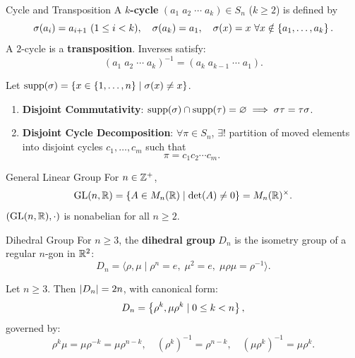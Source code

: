 \documentclass[12pt,a4paper]{article}
\begin{document}
    \begin{defi}{Cycle and Transposition}
        A \textbf{$k$-cycle} $(a_1 \; a_2 \; \cdots \; a_k) \in S_n$ ($k \ge 2$) is defined by
        \[
            \sigma(a_i) = a_{i+1} \ (1 \le i < k), \quad \sigma(a_k) = a_1, \quad \sigma(x) = x \ \forall x \notin \left\{ a_1, \ldots, a_k \right\}.
        \]
        A $2$-cycle is a \textbf{transposition}. Inverses satisfy:
        \[
            (a_1 \; a_2 \; \cdots \; a_k)^{-1} = (a_k \; a_{k-1} \; \cdots \; a_1).
        \]
    \end{defi}
    \bigskip
    
    \begin{prop}
        Let $\operatorname{supp}(\sigma) = \left\{ x \in \left\{ 1,\ldots,n \right\} \mid \sigma(x) \neq x \right\}$.
        \begin{enumerate}
            \item \textbf{Disjoint Commutativity}: $\operatorname{supp}(\sigma) \cap \operatorname{supp}(\tau) = \varnothing \implies \sigma\tau = \tau\sigma$.
            \item \textbf{Disjoint Cycle Decomposition}: $\forall \pi \in S_n$, $\exists!$ partition of moved elements into disjoint cycles $c_1, \ldots, c_m$ such that
            \[
                \pi = c_1 c_2 \cdots c_m.
            \]
        \end{enumerate}
    \end{prop}
    \bigskip
    
    \begin{defi}{General Linear Group}
        For $n \in \mathbb{Z}^+$,
        \[
            \operatorname{GL}(n, \mathbb{R}) = \left\{ A \in M_n(\mathbb{R}) \mid \det(A) \neq 0 \right\} = M_n(\mathbb{R})^\times.
        \]
        $(\operatorname{GL}(n, \mathbb{R}), \cdot)$ is nonabelian for all $n \ge 2$.
    \end{defi}
    \bigskip
    
    \begin{defi}{Dihedral Group}
        For $n \ge 3$, the \textbf{dihedral group} $D_n$ is the isometry group of a regular $n$-gon in $\mathbb{R}^2$:
        \[
            D_n = \langle \rho, \mu \mid \rho^n = e, \; \mu^2 = e, \; \mu\rho\mu = \rho^{-1} \rangle.
        \]
    \end{defi}
    \bigskip
    
    \begin{thm}
        Let $n \ge 3$. Then $\left\lvert D_n \right\rvert = 2n$, with canonical form:
        \[
            D_n = \left\{ \rho^k, \mu\rho^k \mid 0 \le k < n \right\},
        \]
        governed by:
        \[
            \rho^k\mu = \mu\rho^{-k} = \mu\rho^{n-k}, \quad (\rho^k)^{-1} = \rho^{n-k}, \quad (\mu\rho^k)^{-1} = \mu\rho^k.
        \]
    \end{thm}
    \bigskip
    
\end{document}
